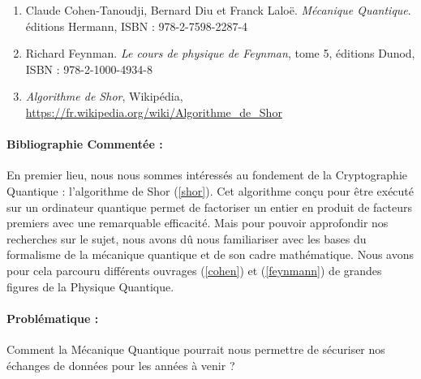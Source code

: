 \documentclass{article}
\begin{document}
\begin{enumerate}
    \item \label{cohen} Claude Cohen-Tanoudji, Bernard Diu et Franck Laloë. \textit{Mécanique Quantique}. éditions Hermann, \small{ISBN : 978-2-7598-2287-4}
    \item \label{feynmann} Richard Feynman. \textit{Le cours de physique de Feynman}, tome 5, éditions Dunod, \small{ISBN : 978-2-1000-4934-8}
    \item \label{shor} \textit{Algorithme de Shor}, Wikipédia, \url{https://fr.wikipedia.org/wiki/Algorithme\_de\_Shor}
\end{enumerate}

\paragraph{Bibliographie Commentée :} En premier lieu, nous nous sommes intéressés au fondement de la Cryptographie Quantique : l'algorithme de Shor (\ref{shor}). Cet algorithme conçu pour être exécuté sur un ordinateur quantique permet de factoriser un entier en produit de facteurs premiers avec une remarquable efficacité. Mais pour pouvoir approfondir nos recherches sur le sujet, nous avons dû nous familiariser avec les bases du formalisme de la mécanique quantique et de son cadre mathématique. Nous avons pour cela parcouru différents ouvrages (\ref{cohen}) et (\ref{feynmann}) de grandes figures de la Physique Quantique.

\paragraph{Problématique :} Comment la Mécanique Quantique pourrait nous permettre de sécuriser nos échanges de données pour les années à venir ?
\end{document}
